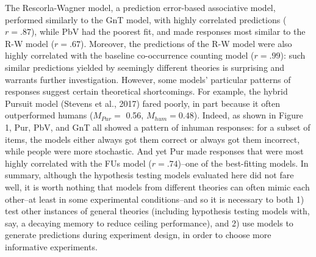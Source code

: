 \documentclass[10pt, letterpaper]{article}
\begin{document}
The Rescorla-Wagner model, a prediction error-based associative model,
performed similarly to the GnT model, with highly correlated predictions
(\(r=.87\)), while PbV had the poorest fit, and made responses most
similar to the R-W model (\(r=.67\)). Moreover, the predictions of the
R-W model were also highly correlated with the baseline co-occurrence
counting model (\(r = .99\)): such similar predictions yielded by
seemingly different theories is surprising and warrants further
investigation. However, some models' particular patterns of responses
suggest certain theoretical shortcomings. For example, the hybrid
Pursuit model (Stevens et al., 2017) fared poorly, in part because it
often outperformed humans (\(M_{Pur} =\) 0.56, \(M_{hum} = 0.48\)).
Indeed, as shown in Figure 1, Pur, PbV, and GnT all showed a pattern of
inhuman responses: for a subset of items, the models either always got
them correct or always got them incorrect, while people were more
stochastic. And yet Pur made responses that were most highly correlated
with the FUs model (\(r=.74\))--one of the best-fitting models. In
summary, although the hypothesis testing models evaluated here did not
fare well, it is worth nothing that models from different theories can
often mimic each other--at least in some experimental conditions--and so
it is necessary to both 1) test other instances of general theories
(including hypothesis testing models with, say, a decaying memory to
reduce ceiling performance), and 2) use models to generate predictions
during experiment design, in order to choose more informative
experiments.
\end{document}
